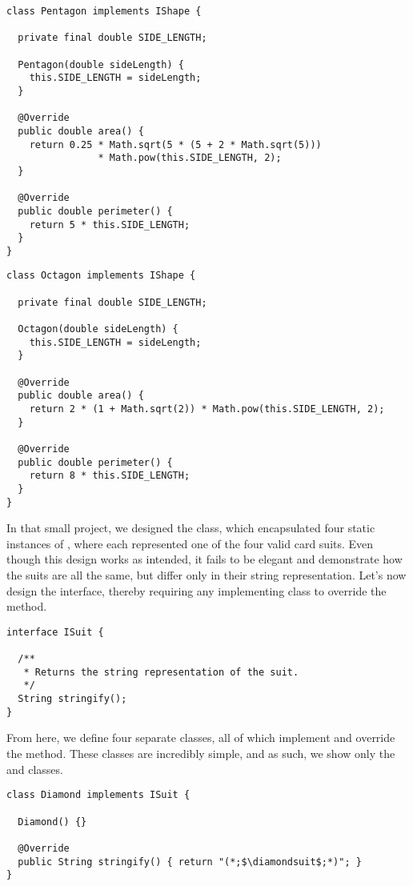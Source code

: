 \begin{lstlisting}[language=MyJava]
class Pentagon implements IShape {
  
  private final double SIDE_LENGTH;

  Pentagon(double sideLength) { 
    this.SIDE_LENGTH = sideLength; 
  }

  @Override
  public double area() {
    return 0.25 * Math.sqrt(5 * (5 + 2 * Math.sqrt(5))) 
                * Math.pow(this.SIDE_LENGTH, 2);
  }

  @Override
  public double perimeter() {
    return 5 * this.SIDE_LENGTH;
  }
}
\end{lstlisting}

\begin{lstlisting}[language=MyJava]
class Octagon implements IShape {

  private final double SIDE_LENGTH;

  Octagon(double sideLength) { 
    this.SIDE_LENGTH = sideLength; 
  }

  @Override
  public double area() {
    return 2 * (1 + Math.sqrt(2)) * Math.pow(this.SIDE_LENGTH, 2);
  }

  @Override
  public double perimeter() {
    return 8 * this.SIDE_LENGTH;
  }
}
\end{lstlisting}

In that small project, we designed the  class, which encapsulated four static instances of , where each represented one of the four valid card suits. 
Even though this design works as intended, it fails to be elegant and demonstrate how the suits are all the same, but differ only in their string representation. 
Let's now design the  interface, thereby requiring any implementing class to override the  method.

\begin{lstlisting}[language=MyJava]
interface ISuit {

  /**
   * Returns the string representation of the suit.
   */
  String stringify();
}
\end{lstlisting}

From here, we define four separate classes, all of which implement  and override the  method. 
These classes are incredibly simple, and as such, we show only the  and  classes.

\begin{lstlisting}[language=MyJava]
class Diamond implements ISuit {
  
  Diamond() {}

  @Override
  public String stringify() { return "(*;$\diamondsuit$;*)"; }
}
\end{lstlisting}

